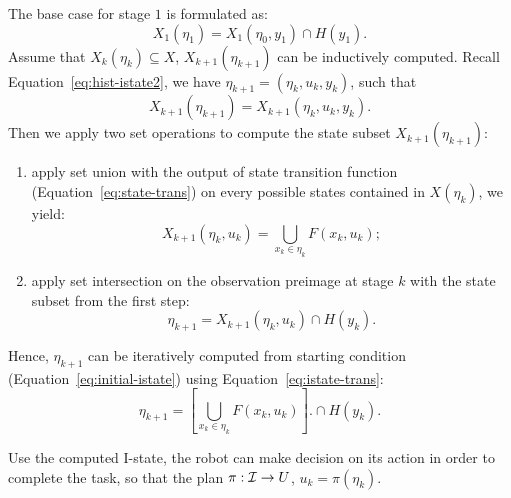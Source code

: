 The base case for stage $1$ is formulated as:
\begin{equation}
  \label{eq:initial-istate}
  X_1(\eta_1) = X_1(\eta_0, y_1) \cap H(y_1).
\end{equation}
%
Assume that $X_k(\eta_k) \subseteq X$, $X_{k+1}(\eta_{k+1})$ can be inductively
computed. 
Recall Equation~\ref{eq:hist-istate2}, we have $\eta_{k+1} =
(\eta_{k}, {u}_{k}, y_{k})$, such that
\begin{equation}
  X_{k+1}(\eta_{k+1}) = X_{k+1}(\eta_{k}, {u}_{k}, y_{k}).
\end{equation}
%
Then we apply two set operations to compute the state subset
$X_{k+1}(\eta_{k+1})$: 
\begin{enumerate}
\item apply set union with the output of state transition function (Equation~\ref{eq:state-trans}) on every possible states contained in $X(\eta_k)$, we yield:
\begin{equation}
  X_{k+1}(\eta_{k}, u_k) =  \bigcup_{x_k \in \eta_k} F(x_k, u_k);
\end{equation}
\item apply set intersection on the observation preimage at stage $k$ with the
state subset from the first step:
\begin{equation}
  \eta_{k+1} = X_{k+1}(\eta_{k}, u_k) \cap H(y_{k}).
\end{equation}
\end{enumerate}
%
Hence, $\eta_{k+1}$ can be iteratively computed from starting condition
(Equation~\ref{eq:initial-istate}) using Equation~\ref{eq:istate-trans}:
\begin{equation}
  \label{eq:istate-trans}
  \eta_{k+1} =
  \left[ \bigcup_{x_k \in \eta_k} F(x_k, u_k) \right].
  \cap H(y_{k}).
\end{equation}


Use the computed I-state, the robot can make decision on its action in order to
complete the task, so that the plan $\pi: \mathcal{I} \to U$, $u_k = \pi(\eta_k)$.

